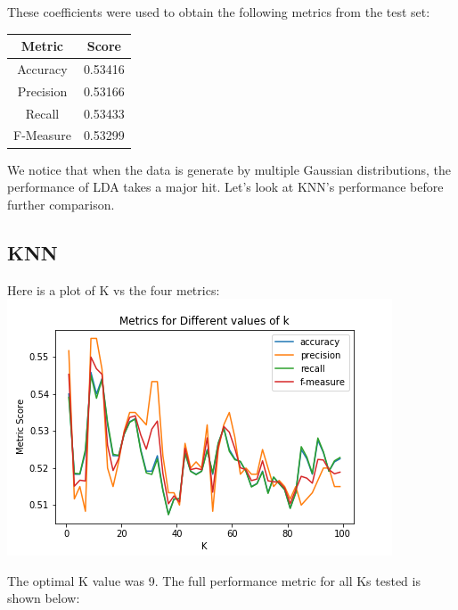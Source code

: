 \documentclass{article}
\begin{document}
These coefficients were used to obtain the following metrics from the test set:
\begin{center}
\begin{tabular}{ |c|c| } 
  \hline
  \textbf{Metric} & \textbf{Score} \\ 
  \hline
  Accuracy & 0.53416 \\
  Precision &  0.53166 \\ 
  Recall & 0.53433 \\
    F-Measure & 0.53299 \\
  \hline
\end{tabular}
\end{center}

We notice that when the data is generate by multiple Gaussian distributions, the performance of LDA takes a major hit. Let's look at KNN's performance before further comparison.

\subsection{KNN}
Here is a plot of K vs the four metrics: \\
\includegraphics[width=\linewidth]{knn_q5.png}

The optimal K value was 9. The full performance metric for all Ks tested is shown below:
\end{document}
